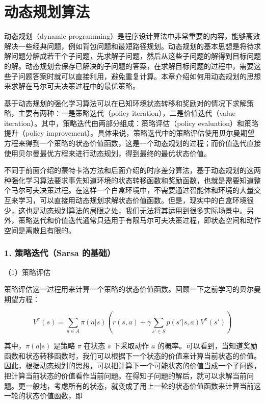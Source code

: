 \setcounter{section}{1}

\hypertarget{ux52a8ux6001ux89c4ux5212ux7b97ux6cd5}{%
\section{动态规划算法}\label{ux52a8ux6001ux89c4ux5212ux7b97ux6cd5}}

动态规划（dynamic programming）是程序设计算法中非常重要的内容，能够高效解决一些经典问题，例如背包问题和最短路径规划。动态规划的基本思想是将待求解问题分解成若干个子问题，先求解子问题，然后从这些子问题的解得到目标问题的解。动态规划会保存已解决的子问题的答案，在求解目标问题的过程中，需要这些子问题答案时就可以直接利用，避免重复计算。本章介绍如何用动态规划的思想来求解在马尔可夫决策过程中的最优策略。

基于动态规划的强化学习算法可以在已知环境状态转移和奖励对的情况下求解策略，主要有两种：一是策略迭代（policy iteration），二是价值迭代（value iteration）。其中，策略迭代由两部分组成：策略评估（policy evaluation）和策略提升（policy improvement）。具体来说，策略迭代中的策略评估使用贝尔曼期望方程来得到一个策略的状态价值函数，这是一个动态规划的过程；而价值迭代直接使用贝尔曼最优方程来进行动态规划，得到最终的最优状态价值。

不同于前面介绍的蒙特卡洛方法和后面介绍的时序差分算法，基于动态规划的这两种强化学习算法要求事先知道环境的状态转移函数和奖励函数，也就是需要知道整个马尔可夫决策过程。在这样一个白盒环境中，不需要通过智能体和环境的大量交互来学习，可以直接用动态规划求解状态价值函数。但是，现实中的白盒环境很少，这也是动态规划算法的局限之处，我们无法将其运用到很多实际场景中。另外，策略迭代和价值迭代通常只适用于有限马尔可夫决策过程，即状态空间和动作空间是离散且有限的。

\hypertarget{ux7b56ux7565ux8fedux4ee3sarsa-ux7684ux57faux7840}{%
\subsubsection{1. 策略迭代（Sarsa 的基础）}\label{ux7b56ux7565ux8fedux4ee3sarsa-ux7684ux57faux7840}}

（1）策略评估

策略评估这一过程用来计算一个策略的状态价值函数。回顾一下之前学习的贝尔曼期望方程：

\[
V^{\pi}(s)=\sum_{a\in A}\pi(a|s)(r(s,a)+\gamma\sum_{s'\in S}p(s'|s,a)V^{\pi}(s'))
\]

其中，\(\pi(a|s)\) 是策略 \(\pi\) 在状态 \(s\) 下采取动作 \(a\) 的概率。可以看到，当知道奖励函数和状态转移函数时，我们可以根据下一个状态的价值来计算当前状态的价值。因此，根据动态规划的思想，可以把计算下一个可能状态的价值当成一个子问题，把计算当前状态的价值看作当前问题。在得知子问题的解后，就可以求解当前问题。更一般地，考虑所有的状态，就变成了用上一轮的状态价值函数来计算当前这一轮的状态价值函数，即

